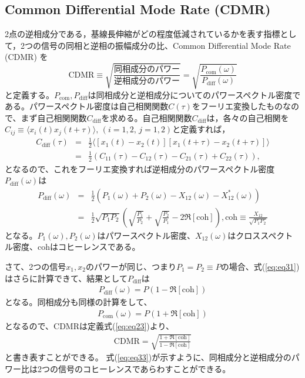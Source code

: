 \subsection{Common Differential Mode Rate (CDMR)}
2点の逆相成分である，基線長伸縮がどの程度低減されているかを表す指標として，2つの信号の同相と逆相の振幅成分の比、Common Differential Mode Rate (CDMR) を
\begin{equation}
  \boxed{\mathrm{CDMR} \equiv \sqrt{\frac{同相成分のパワー}{逆相成分のパワー}} = \sqrt{\frac{P_{\mathrm{com}}(\omega)}{P_{\mathrm{diff}}(\omega)}}} \label{eq:eq23}
\end{equation}
と定義する。$P_{\mathrm{com}},P_{\mathrm{diff}}$は同相成分と逆相成分についてのパワースペクトル密度である。パワースペクトル密度は自己相関関数$C(\tau)$をフーリエ変換したものなので、まず自己相関関数$C_{\mathrm{diff}}$を求める。自己相関関数$C_{\mathrm{diff}}$は，各々の自己相関を$ C_{ij} \equiv \langle x_{i}(t)x_{j}(t+\tau)\rangle,\, (i=1,2,\,j=1,2)$と定義すれば， 
\begin{eqnarray}
  C_{\mathrm{diff}}(\tau) &=& \frac{1}{2}
  \langle
  \left[ x_{1}(t)-x_{2}(t) \right]   \left[ x_{1}(t+\tau)-x_{2}(t+\tau) \right]
  \rangle \\
  &=& \frac{1}{2}\left( C_{11}(\tau) - C_{12}(\tau) - C_{21}(\tau) + C_{22}(\tau) \right), 
\end{eqnarray}
となるので、これをフーリエ変換すれば逆相成分のパワースペクトル密度$P_{\mathrm{diff}}(\omega)$は
\begin{eqnarray}
  P_{\mathrm{diff}}(\omega) &=& \frac{1}{2}\left( P_{1}(\omega) + P_{2}(\omega) - X_{12}(\omega) - X_{12}^*(\omega) \right)\\
  &=& \frac{1}{2} \sqrt{P_{1}P_{2}} \left( \sqrt{\frac{P_{1}}{P_{2}}}+ \sqrt{\frac{P_{2}}{P_{1}}} - 2\Re \left[\mathrm{coh} \right] \right) , 
\mathrm{coh} \equiv \frac{X_{12}}{\sqrt{P_{1}P_{2}}} \label{eq:eq31}
\end{eqnarray}
となる。$P_{1}(\omega),P_{2}(\omega)$はパワースペクトル密度、$X_{12}(\omega)$はクロススペクトル密度、$\mathrm{coh}$はコヒーレンスである。


さて、2つの信号$x_{1},x_{2}$のパワーが同じ、つまり$P_{1}=P_{2}\equiv P$の場合、式(\ref{eq:eq31})はさらに計算できて、結果として$P_{\mathrm{diff}}$は
\begin{eqnarray}
 P_{\mathrm{diff}}(\omega) = P \left(1 - \Re \left[\mathrm{coh} \right] \right) \label{eq:eq35}
\end{eqnarray}
となる。同相成分も同様の計算をして、
\begin{eqnarray}
 P_{\mathrm{com}}(\omega) = P \left(1 + \Re \left[\mathrm{coh} \right] \right) \label{eq:eq36}
\end{eqnarray}
となるので、$\mathrm{CDMR}$は定義式(\ref{eq:eq23})より、
\begin{eqnarray}
 \mathrm{CDMR} = \sqrt{\frac{1 + \Re \left[\mathrm{coh} \right] }{1 - \Re \left[\mathrm{coh} \right]}} \label{eq:eq33}
\end{eqnarray}
と書き表すことができる。
式(\ref{eq:eq33})が示すように、同相成分と逆相成分のパワー比は2つの信号のコヒーレンスであらわすことができる。


